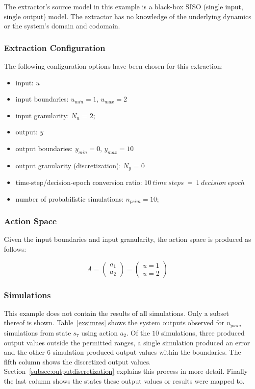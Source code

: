 The extractor's source model in this example is a black-box SISO (single input, single output) model. The extractor has no knowledge of the underlying dynamics or the system's domain and codomain.

\subsubsection{Extraction Configuration}

The following configuration options have been chosen for this extraction:

\begin{itemize}
\item input: $u$
\item input boundaries: $u_{min} = 1$, $u_{max} = 2$
\item input granularity: $N_u$ = 2;
\item output: $y$
\item output boundaries: $y_{min} = 0$, $y_{max} = 10$
\item output granularity (discretization): $N_y$ = 0
\item time-step/decision-epoch conversion ratio: $10\ time\ steps\ =\ 1\ decision\ epoch$
\item number of probabilistic simulations: $n_{psim} = 10$;
\end{itemize}

\subsubsection{Action Space}

Given the input boundaries and input granularity, the action space is produced as follows:

\[
A = \begin{pmatrix} a_1 \\ a_2 \end{pmatrix}
 = \begin{pmatrix} u = 1 \\ u = 2 \end{pmatrix}
\]

\subsubsection{Simulations}

This example does not contain the results of all simulations. Only a subset thereof is shown. Table~\ref{exsimres} shows the system outputs observed for $n_{psim}$ simulations from state $s_7$ using action $a_2$. Of the $10$ simulations, three produced output values outside the permitted ranges, a single simulation produced an error and the other $6$ simulation produced output values within the boundaries. The fifth column shows the discretized output values. Section~\ref{subsec:outputdiscretization} explains this process in more detail. Finally the last column shows the states these output values or results were mapped to.

